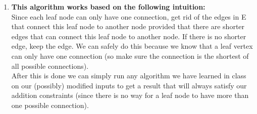 \documentclass[11pt,twoside]{article}
\begin{document}
\begin{enumerate}[leftmargin=0pt,label=(\alph*)]
\item {\bf This algorithm works based on the following intuition:}\\
Since each leaf node can only have one connection, get rid of the edges in E that connect this leaf node to another node provided that there are shorter edges that can connect this leaf node to another node. If there is no shorter edge, keep the edge. We can safely do this because we know that a leaf vertex can only have one connection (so make sure the connection is the shortest of all possible connections).\\
After this is done we can simply run any algorithm we have learned in class on our (possibly) modified inputs to get a result that will always satisfy our addition constraints (since there is no way for a leaf node to have more than one possible connection).
\end{enumerate}
\end{document}
